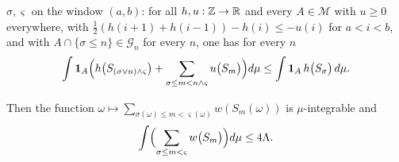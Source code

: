 \begin{lemma}
\begin{enumerate}
$\sigma,\varsigma$ on the window $(a,b)$: for all $h,u:\mathbb{Z}\to\mathbb{R}$ and every
$A\in\mathcal M$ with $u\ge0$ everywhere, with
$\tfrac12(h(i+1)+h(i-1))-h(i)\le-u(i)$ for $a<i<b$, and with
$A\cap\{\sigma\le n\}\in\mathcal G_n$ for every $n$, one has for every $n$
\[
  \int\mathbf1_A\Bigl(h\bigl(S_{(\sigma\vee n)\wedge\varsigma}\bigr)
    +\sum_{\sigma\le m<n\wedge\varsigma}u\bigl(S_m\bigr)\Bigr)d\mu
  \le\int\mathbf1_A\,h\bigl(S_\sigma\bigr)\,d\mu .
\]
\end{enumerate}
Then the function
$\omega\mapsto\sum_{\sigma(\omega)\le m<\varsigma(\omega)}w(S_m(\omega))$ is
$\mu$-integrable and
\begin{equation}\label{eq:lgsb-bound}
  \int\Bigl(\sum_{\sigma\le m<\varsigma}w\bigl(S_m\bigr)\Bigr)d\mu
   \le4\Lambda .
\end{equation}
\end{lemma}
